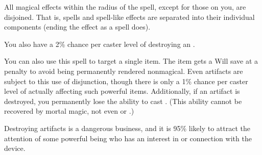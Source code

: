 \spellrng{\rngmed}
\begin{spelleffect}
  All magical effects within the radius of the spell, except for those on you, are disjoined. That is, spells and spell-like effects are separated into their individual components (ending the effect as a  spell does).
  \par You also have a 2\% chance per caster level of destroying an .
  \par You can also use this spell to target a single item. The item gets a Will save at a  penalty to avoid being permanently rendered nonmagical. Even artifacts are subject to this use of disjunction, though there is only a 1\% chance per caster level of actually affecting such powerful items. Additionally, if an artifact is destroyed, you permanently lose the ability to cast . (This ability cannot be recovered by mortal magic, not even  or .)
  \par {} Destroying artifacts is a dangerous business, and it is 95\% likely to attract the attention of some powerful being who has an interest in or connection with the device.
\end{spelleffect}

